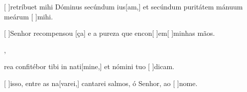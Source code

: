 {  {\item {}[ ]{re}tríbuet mihi Dóminus secúndum ius[am,] et secúndum puritátem mánuum meárum [ ]{mi}hi.}%
    {\item {}[ ]{Se}nhor recompensou [ça] e a pureza que encon[ ]{em}[ ]{mi}nhas mãos.},
  {\item {}rea confitébor tibi in nati[mine,] et nómini tuo [ ]{di}cam.}%
    {\item {}[ ]{is}so, entre as na[varei,] cantarei salmos, ó Senhor, ao [ ]{no}me.}
}